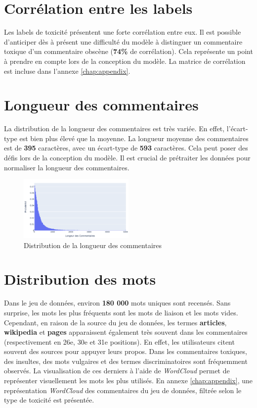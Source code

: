 \newpage
\section*{Corrélation entre les labels}
Les labels de toxicité présentent une forte corrélation entre eux. 
Il est possible d'anticiper dès à présent une difficulté du modèle à distinguer un commentaire toxique d'un commentaire obscène (\textbf{74\%} de corrélation).
Cela représente un point à prendre en compte lors de la conception du modèle. La matrice de corrélation est incluse dans l'annexe \ref{chap:appendix}. 

\section*{Longueur des commentaires}
La distribution de la longueur des commentaires est très variée. En effet, l'écart-type est bien plus élevé que la moyenne. 
La longueur moyenne des commentaires est de \textbf{395} caractères, avec un écart-type de \textbf{593} caractères. 
Cela peut poser des défis lors de la conception du modèle. Il est crucial de prétraiter les données pour normaliser la longueur des commentaires.
\begin{figure}[h]
    \centering
    \includegraphics[width=0.5\textwidth]{figures/long-commentaire-prob.png}
    \caption{Distribution de la longueur des commentaires}
\end{figure}

\section*{Distribution des mots}
Dans le jeu de données, environ \textbf{180 000} mots uniques sont recensés. 
Sans surprise, les mots les plus fréquents sont les mots de liaison et les mots vides.
Cependant, en raison de la source du jeu de données, les termes \textbf{articles}, \textbf{wikipedia} et \textbf{pages} apparaissent également très souvent dans les commentaires (respectivement en 26e, 30e et 31e positions).
En effet, les utilisateurs citent souvent des sources pour appuyer leurs propos. Dans les commentaires toxiques, des insultes, des mots vulgaires et des termes discriminatoires sont fréquemment observés. 
La visualisation de ces derniers à l'aide de \textit{WordCloud} permet de représenter visuellement les mots les plus utilisés. 
En annexe \ref{chap:appendix}, une représentation \textit{WordCloud} des commentaires du jeu de données, filtrée selon le type de toxicité est présentée.